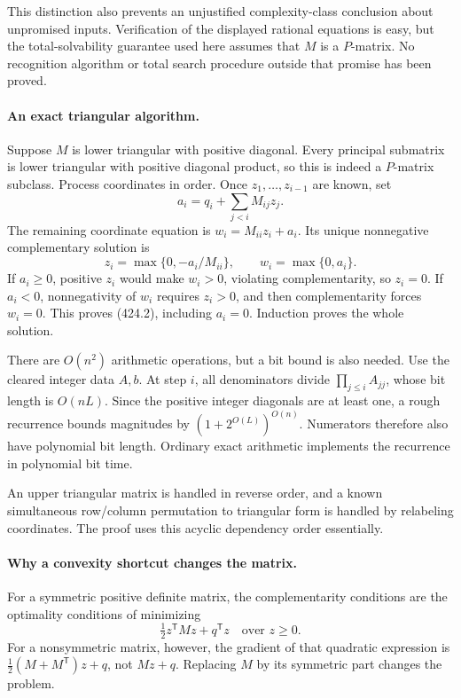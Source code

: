 \documentclass[11pt]{article}
\begin{document}
This distinction also prevents an unjustified complexity-class conclusion about unpromised inputs. Verification of the displayed rational equations is easy, but the total-solvability guarantee used here assumes that $M$ is a $P$-matrix. No recognition algorithm or total search procedure outside that promise has been proved.

\paragraph{An exact triangular algorithm.}
Suppose $M$ is lower triangular with positive diagonal. Every principal submatrix is lower triangular with positive diagonal product, so this is indeed a $P$-matrix subclass. Process coordinates in order. Once $z_1,\ldots,z_{i-1}$ are known, set
\[
 a_i=q_i+\sum_{j<i}M_{ij}z_j.
\]
The remaining coordinate equation is $w_i=M_{ii}z_i+a_i$. Its unique nonnegative complementary solution is
\[
 z_i=\max\{0,-a_i/M_{ii}\},\qquad
 w_i=\max\{0,a_i\}.
 \tag{424.2}
\]
If $a_i\ge0$, positive $z_i$ would make $w_i>0$, violating complementarity, so $z_i=0$. If $a_i<0$, nonnegativity of $w_i$ requires $z_i>0$, and then complementarity forces $w_i=0$. This proves (424.2), including $a_i=0$. Induction proves the whole solution.

There are $O(n^2)$ arithmetic operations, but a bit bound is also needed. Use the cleared integer data $A,b$. At step $i$, all denominators divide $\prod_{j\le i}A_{jj}$, whose bit length is $O(nL)$. Since the positive integer diagonals are at least one, a rough recurrence bounds magnitudes by $(1+2^{O(L)})^{O(n)}$. Numerators therefore also have polynomial bit length. Ordinary exact arithmetic implements the recurrence in polynomial bit time.

An upper triangular matrix is handled in reverse order, and a known simultaneous row/column permutation to triangular form is handled by relabeling coordinates. The proof uses this acyclic dependency order essentially.

\paragraph{Why a convexity shortcut changes the matrix.}
For a symmetric positive definite matrix, the complementarity conditions are the optimality conditions of minimizing
\[
 \tfrac12 z^{\mathsf T}Mz+q^{\mathsf T}z
 \quad\text{over }z\ge0.
\]
For a nonsymmetric matrix, however, the gradient of that quadratic expression is
$\tfrac12(M+M^{\mathsf T})z+q$, not $Mz+q$. Replacing $M$ by its symmetric part changes the problem.
\end{document}
